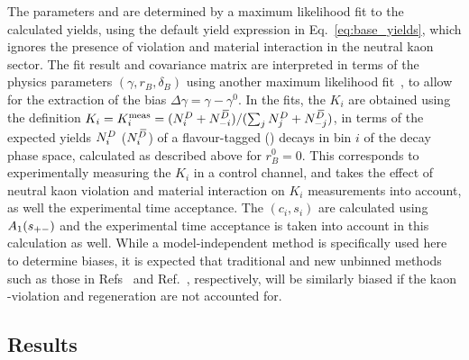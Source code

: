 The parameters \xpm and \ypm are determined by a maximum likelihood fit to the calculated yields, using the default yield expression in Eq.~\eqref{eq:base_yields}, which ignores the presence of \CP violation and material interaction in the neutral kaon sector. The fit result and covariance matrix are interpreted in terms of the physics parameters $(\gamma, r_B, \delta_B)$ using another maximum likelihood fit~\cite{Gammacombo2016}, to allow for the extraction of the bias $\Delta\gamma = \gamma - \gamma^0$. In the fits, the $K_i$ are obtained using the definition $K_i=K_i^\text{meas}=({N^{D}_i + N^{\kern 0.18em\overline{\kern -0.18em D}}_{-i}})/({\sum_j N^{D}_j +N^{\kern 0.18em\overline{\kern -0.18em D}}_{-j}})$, in terms of the expected yields $N^{D}_i$ ($N^{{\kern 0.18em\overline{\kern -0.18em D}}}_i$) of a flavour-tagged \Dz (\Dzb) decays in bin $i$ of the \D decay phase space, calculated as described above for $r_B^0=0$. This corresponds to experimentally measuring the $K_i$ in a control channel, and takes the effect of neutral kaon \CP violation and material interaction on $K_i$ measurements into account, as well the experimental time acceptance. The $(c_i, s_i)$ are calculated using $A_1(s_{+-})$ and the experimental time acceptance is taken into account in this calculation as well. While a model-independent method is specifically used here to determine biases, it is expected that traditional and new unbinned methods such as those in Refs~\cite{BELLE2004,BELLE2006,BELLE2010,BABAR2005,BABAR2008,BABAR2010,LHCb-PAPER-2014-017} and Ref.~\cite{Poluektov2018}, respectively, will be similarly biased if the kaon \CP-violation and regeneration are not accounted for.





\subsection{Results} %
\label{sub:bias_results}




